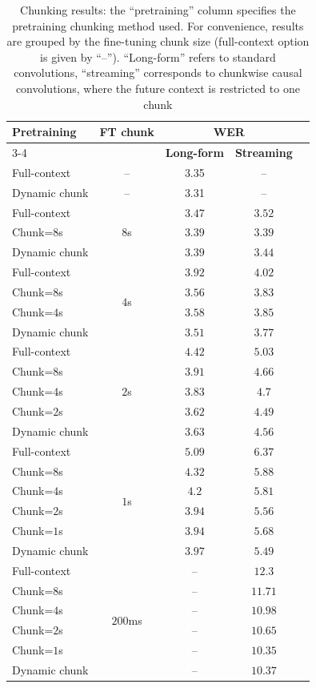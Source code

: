 \documentclass{Interspeech}
\begin{document}
\begin{table}[ht]
\centering
\caption{Chunking results: the ``pretraining'' column specifies the pretraining chunking method used. For convenience, results are grouped by the fine-tuning chunk size (full-context option is given by ``{--}''). ``Long-form'' refers to standard convolutions, ``streaming'' corresponds to chunkwise causal convolutions, where the future context is restricted to one chunk}
\begin{tabular}{lcccc}
\toprule
\multirow{2}{*}{\textbf{Pretraining}} & \multirow{2}{*}{\textbf{FT chunk}} & \multicolumn{2}{c}{\textbf{WER}} \\
\cmidrule(lr){3-4}
 & & \textbf{Long-form} & \textbf{Streaming}  \\
\midrule
Full-context & {--} & 3.35 & {--} \\
\midrule
Dynamic chunk & {--} & 3.31 & {--} \\
\midrule

Full-context & \multirow{3}{*}{$8$s} & $3.47$ & $3.52$ \\
Chunk=$8$s & & $3.39$ & $3.39$ \\
Dynamic chunk & & $3.39$ & $3.44$ \\
\midrule
Full-context & \multirow{4}{*}{$4$s} & $3.92$ & $4.02$ \\
Chunk=$8$s & & $3.56$ & $3.83$ \\
Chunk=$4$s & & $3.58$ & $3.85$ \\
Dynamic chunk & & $3.51$ & $3.77$ \\
\midrule
Full-context & \multirow{5}{*}{$2$s} & $4.42$ & $5.03$ \\
Chunk=$8$s & & $3.91$ & $4.66$ \\
Chunk=$4$s & & $3.83$ & $4.7$ \\
Chunk=$2$s & & $3.62$ & $4.49$ \\
Dynamic chunk & & $3.63$ & $4.56$ \\
\midrule
Full-context & \multirow{6}{*}{$1$s} & $5.09$ & $6.37$ \\
Chunk=$8$s & & $4.32$ & $5.88$ \\
Chunk=$4$s & & $4.2$ & $5.81$ \\
Chunk=$2$s & & $3.94$ & $5.56$ \\
Chunk=$1$s & & $3.94$ & $5.68$ \\
Dynamic chunk & & $3.97$ & $5.49$ \\
\midrule
Full-context & \multirow{6}{*}{$200$ms} & {--} & $12.3$ \\
Chunk=$8$s & & {--} & $11.71$ \\
Chunk=$4$s & & {--} & $10.98$ \\
Chunk=$2$s & & {--} & $10.65$ \\
Chunk=$1$s & & {--} & $10.35$ \\
Dynamic chunk & & {--} & $10.37$ \\
\bottomrule
\end{tabular}
\label{tab:chunk}
\end{table}
\end{document}
